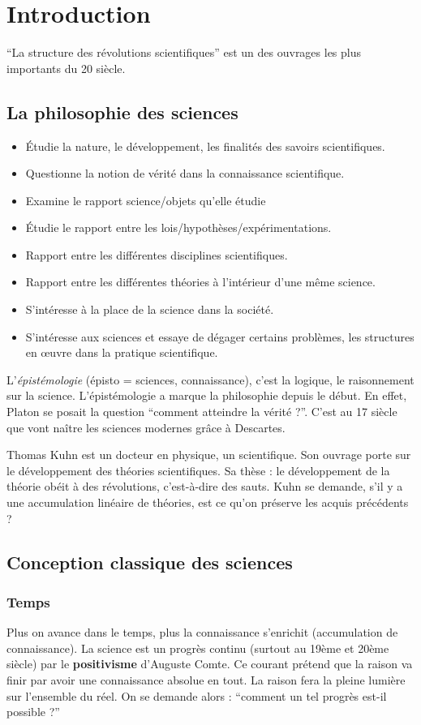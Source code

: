 \documentclass[11pt,a4paper]{article} %
\begin{document}
\section{Introduction}
``La structure des révolutions scientifiques'' est un des ouvrages les plus importants du 20\ieme{} siècle.

\subsection{La philosophie des sciences}
\begin{itemize}
	\item Étudie la nature, le développement, les finalités des savoirs scientifiques.
	\item Questionne la notion de vérité dans la connaissance scientifique.
	\item Examine le rapport science/objets qu'elle étudie
	\item Étudie le rapport entre les lois/hypothèses/expérimentations.
	\item Rapport entre les différentes disciplines scientifiques.
	\item Rapport entre les différentes théories à l'intérieur d'une même science.
	\item S'intéresse à la place de la science dans la société.
	\item S'intéresse aux sciences et essaye de dégager certains problèmes, les structures en œuvre dans la pratique scientifique.
\end{itemize}

L'\emph{épistémologie} (épisto = sciences, connaissance), c'est la logique, le raisonnement sur la science.
L'épistémologie a marque la philosophie depuis le début.
En effet, Platon se posait la question ``comment atteindre la vérité ?''.
C'est au 17\ieme{} siècle que vont naître les sciences modernes grâce à Descartes.

Thomas Kuhn est un docteur en physique, un scientifique.
Son ouvrage porte sur le développement des théories scientifiques.
Sa thèse : le développement de la théorie obéit à des révolutions, c'est-à-dire des sauts.
Kuhn se demande, s'il y a une accumulation linéaire de théories, est ce qu'on préserve les acquis précédents ?

\subsection{Conception classique des sciences}
\subsubsection{Temps}
Plus on avance dans le temps, plus la connaissance s'enrichit (accumulation de connaissance).
La science est un progrès continu (surtout au 19ème et 20ème siècle) par le \textbf{positivisme} d'Auguste Comte.
Ce courant prétend que la raison va finir par avoir une connaissance absolue en tout.
La raison fera la pleine lumière sur l'ensemble du réel.
On se demande alors : ``comment un tel progrès est-il possible ?''
\end{document}
